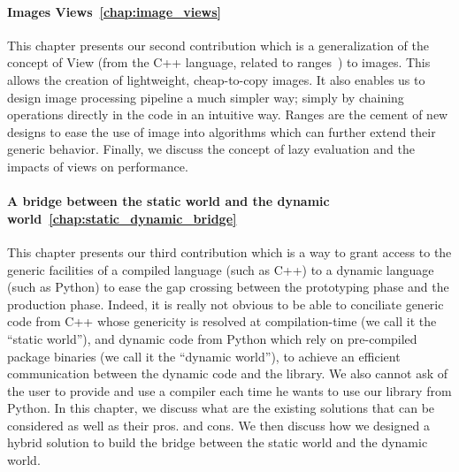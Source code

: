 \paragraph{Images Views~\ref{chap:image_views}} This chapter presents our second contribution which is a generalization
of the concept of View (from the C++ language, related to ranges~\parencite{niebler.2018.ranges}) to images. This allows
the creation of lightweight, cheap-to-copy images. It also enables us to design image processing pipeline a much simpler
way; simply by chaining operations directly in the code in an intuitive way. Ranges are the cement of new designs to
ease the use of image into algorithms which can further extend their generic behavior. Finally, we discuss the concept
of lazy evaluation and the impacts of views on performance.

\paragraph{A bridge between the static world and the dynamic world~\ref{chap:static_dynamic_bridge}} This chapter
presents our third contribution which is a way to grant access to the generic facilities of a compiled language (such as
C++) to a dynamic language (such as Python) to ease the gap crossing between the prototyping phase and the production
phase. Indeed, it is really not obvious to be able to conciliate generic code from C++ whose genericity is resolved at
compilation-time (we call it the ``static world''), and dynamic code from Python which rely on pre-compiled package
binaries (we call it the ``dynamic world''), to achieve an efficient communication between the dynamic code and the
library. We also cannot ask of the user to provide and use a compiler each time he wants to use our library from Python.
In this chapter, we discuss what are the existing solutions that can be considered as well as their pros. and cons. We
then discuss how we designed a hybrid solution to build the bridge between the static world and the dynamic world.
